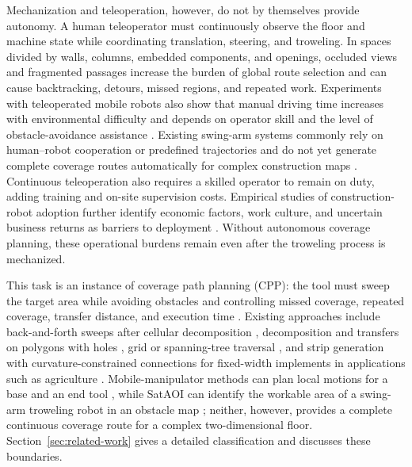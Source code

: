 Mechanization and teleoperation, however, do not by themselves provide autonomy. A human teleoperator must continuously observe the floor and machine state while coordinating translation, steering, and troweling. In spaces divided by walls, columns, embedded components, and openings, occluded views and fragmented passages increase the burden of global route selection and can cause backtracking, detours, missed regions, and repeated work. Experiments with teleoperated mobile robots also show that manual driving time increases with environmental difficulty and depends on operator skill and the level of obstacle-avoidance assistance \cite{storms2016}. Existing swing-arm systems commonly rely on human--robot cooperation or predefined trajectories and do not yet generate complete coverage routes automatically for complex construction maps \cite{lin2025}. Continuous teleoperation also requires a skilled operator to remain on duty, adding training and on-site supervision costs. Empirical studies of construction-robot adoption further identify economic factors, work culture, and uncertain business returns as barriers to deployment \cite{ocs2024,delgado2019}. Without autonomous coverage planning, these operational burdens remain even after the troweling process is mechanized.

This task is an instance of coverage path planning (CPP): the tool must sweep the target area while avoiding obstacles and controlling missed coverage, repeated coverage, transfer distance, and execution time \cite{galceran2013}. Existing approaches include back-and-forth sweeps after cellular decomposition \cite{choset1998,bahnemann2021}, decomposition and transfers on polygons with holes \cite{polygoncoverage}, grid or spanning-tree traversal \cite{gabriely2001,nobleo}, and strip generation with curvature-constrained connections for fixed-width implements in applications such as agriculture \cite{mier2023,fields2cover}. Mobile-manipulator methods can plan local motions for a base and an end tool \cite{thakar2022}, while SatAOI can identify the workable area of a swing-arm troweling robot in an obstacle map \cite{lin2025}; neither, however, provides a complete continuous coverage route for a complex two-dimensional floor. Section~\ref{sec:related-work} gives a detailed classification and discusses these boundaries.

